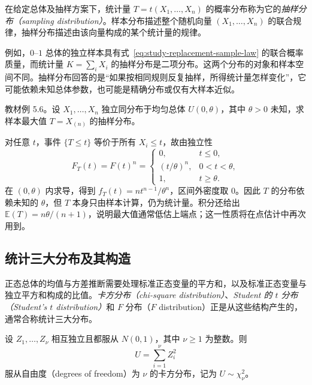 \begin{definition}[抽样分布]
\label{def:study-sampling-distribution}
在给定总体及抽样方案下，统计量 $T=t(X_1,\ldots,X_n)$ 的概率分布称为它的\emph{抽样分布（sampling distribution）}。样本分布描述整个随机向量 $(X_1,\ldots,X_n)$ 的联合规律，抽样分布描述由该向量构成的某个统计量的规律。
\end{definition}

例如，$0$--$1$ 总体的独立样本具有式~\eqref{eq:study-replacement-sample-law} 的联合概率质量，而统计量 $K=\sum_iX_i$ 的抽样分布是二项分布。这两个分布的对象和样本空间不同。抽样分布回答的是“如果按相同规则反复抽样，所得统计量怎样变化”，它可能依赖未知总体参数，也可能是精确分布或仅有大样本近似。

\begin{example}
\label{ex:study-uniform-maximum}
教材例 5.6。设 $X_1,\ldots,X_n$ 独立同分布于均匀总体 $U(0,\theta)$，其中 $\theta>0$ 未知，求样本最大值 $T=X_{(n)}$ 的抽样分布。
\end{example}

\begin{solve}
对任意 $t$，事件 $\{T\le t\}$ 等价于所有 $X_i\le t$，故由独立性
\begin{equation}
  F_T(t)=F(t)^n=
  \begin{cases}
    0,&t\le0,\\
    (t/\theta)^n,&0<t<\theta,\\
    1,&t\ge\theta.
  \end{cases}
  \label{eq:study-uniform-maximum-cdf}
\end{equation}
在 $(0,\theta)$ 内求导，得到 $f_T(t)=nt^{n-1}/\theta^n$，区间外密度取 $0$。因此 $T$ 的分布依赖未知的 $\theta$，但 $T$ 本身只由样本计算，仍为统计量。积分还给出 $\mathbb E(T)=n\theta/(n+1)$，说明最大值通常低估上端点；这一性质将在点估计中再次用到。
\end{solve}

\subsection{统计三大分布及其构造}

正态总体的均值与方差推断需要处理标准正态变量的平方和，以及标准正态变量与独立平方和构成的比值。\emph{卡方分布（chi-square distribution）}、\emph{Student 的 $t$ 分布（Student's $t$ distribution）}和 $F$ 分布（$F$ distribution）正是从这些结构产生的，通常合称统计三大分布。

\begin{definition}[卡方分布]
\label{def:study-chi-square}
设 $Z_1,\ldots,Z_\nu$ 相互独立且都服从 $N(0,1)$，其中 $\nu\ge1$ 为整数。则
\[
  U=\sum_{i=1}^{\nu}Z_i^2
\]
服从自由度（degrees of freedom）为 $\nu$ 的卡方分布，记为 $U\sim\chi^2_\nu$。
\end{definition}

